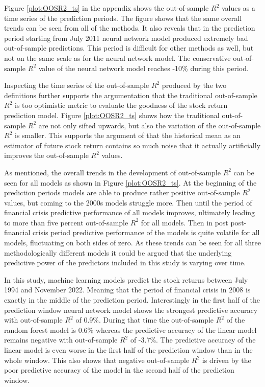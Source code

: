 \documentclass[12pt]{article}
\begin{document}

Figure \ref{plot:OOSR2_ts} in the appendix shows the out-of-sample $R^2$ values as a time series of the prediction periods. The figure shows that the same overall trends can be seen from all of the methods. It also reveals that in the prediction period starting from July 2011 neural network model produced extremely bad out-of-sample predictions. This period is difficult for other methods as well, but not on the same scale as for the neural network model. The conservative out-of-sample $R^2$ value of the neural network model reaches -10\% during this period. \par

Inspecting the time series of the out-of-sample $R^2$ produced by the two definitions further supports the argumentation that the traditional out-of-sample $R^2$ is too optimistic metric to evaluate the goodness of the stock return prediction model. Figure \ref{plot:OOSR2_ts} shows how the traditional out-of-sample $R^2$ are not only sifted upwards, but also the variation of the out-of-sample $R^2$ is smaller. This supports the argument of \citet{guetal} that the historical mean as an estimator of future stock return contains so much noise that it actually artificially improves the out-of-sample $R^2$ values. \par

As mentioned, the overall trends in the development of out-of-sample $R^2$ can be seen for all models as shown in Figure \ref{plot:OOSR2_ts}. At the beginning of the prediction periods models are able to produce rather positive out-of-sample $R^2$ values, but coming to the 2000s models struggle more. Then until the period of financial crisis predictive performance of all models improves, ultimately leading to more than five percent out-of-sample $R^2$ for all models. Then in post post-financial crisis period predictive performance of the models is quite volatile for all models, fluctuating on both sides of zero. As these trends can be seen for all three methodologically different models it could be argued that the underlying predictive power of the predictors included in this study is varying over time. \par

In this study, machine learning models predict the stock returns between July 1994 and November 2022. Meaning that the period of financial crisis in 2008 is exactly in the middle of the prediction period. Interestingly in the first half of the prediction window neural network model shows the strongest predictive accuracy with out-of-sample $R^2$ of 0.9\%. During that time the out-of-sample $R^2$ of the random forest model is 0.6\% whereas the predictive accuracy of the linear model remains negative with out-of-sample $R^2$ of -3.7\%. The predictive accuracy of the linear model is even worse in the first half of the prediction window than in the whole window. This also shows that negative out-of-sample $R^2$ is driven by the poor predictive accuracy of the model in the second half of the prediction window. \par
\end{document}
